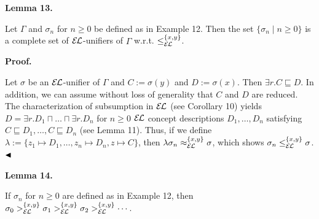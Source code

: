  
\par\medskip\noindent\textbf{Lemma 13.}\par
 
 
Let $\Gamma$ and $\sigma_{n}$ for $n\geq 0$ be defined as in Example 12. Then the set $\{\sigma_{n}\mid n\geq 0\}$ is a complete set of $\mathcal{E\mkern-1.618muL}$-unifiers of $\Gamma$ w.r.t. $\leq_{\mathcal{E\mkern-1.618muL}}^{\{x,y\}}$.\par
 
 
 
 
\par\medskip\noindent\textbf{Proof.}\par
 
 
Let $\sigma$ be an $\mathcal{E\mkern-1.618muL}$-unifier of $\Gamma$ and $C:=\sigma(y)$ and $D:=\sigma(x)$. Then $\exists r.C\sqsubseteq D$. In addition, we can assume without loss of generality that $C$ and $D$ are reduced. The characterization of subsumption in $\mathcal{E\mkern-1.618muL}$ (see Corollary 10) yields $D=\exists r.D_{1}\sqcap\ldots\sqcap\exists r.D_{n}$ for $n\geq 0$ $\mathcal{E\mkern-1.618muL}$ concept descriptions $D_{1},\ldots,D_{n}$ satisfying $C\sqsubseteq D_{1},\ldots,C\sqsubseteq D_{n}$ (see Lemma 11). Thus, if we define $\lambda:=\{z_{1}\mapsto D_{1},\ldots,z_{n}\mapsto D_{n},z\mapsto C\}$, then $\lambda\sigma_{n}\approx_{\mathcal{E\mkern-1.618muL}}^{\{x,y\}}\sigma$, which shows $\sigma_{n}\leq_{\mathcal{E\mkern-1.618muL}}^{\{x,y\}}\sigma$. $\hfill\blacktriangleleft$\par
 
 
 
\par\medskip\noindent\textbf{Lemma 14.}\par
 
 
If $\sigma_{n}$ for $n\geq 0$ are defined as in Example 12, then $\sigma_{0}>_{\mathcal{E\mkern-1.618muL}}^{\{x,y\}}\sigma_{1}>_{\mathcal{E%
\mkern-1.618muL}}^{\{x,y\}}\sigma_{2}>_{\mathcal{E\mkern-1.618muL}}^{\{x,y\}}\cdots$.\par
 
